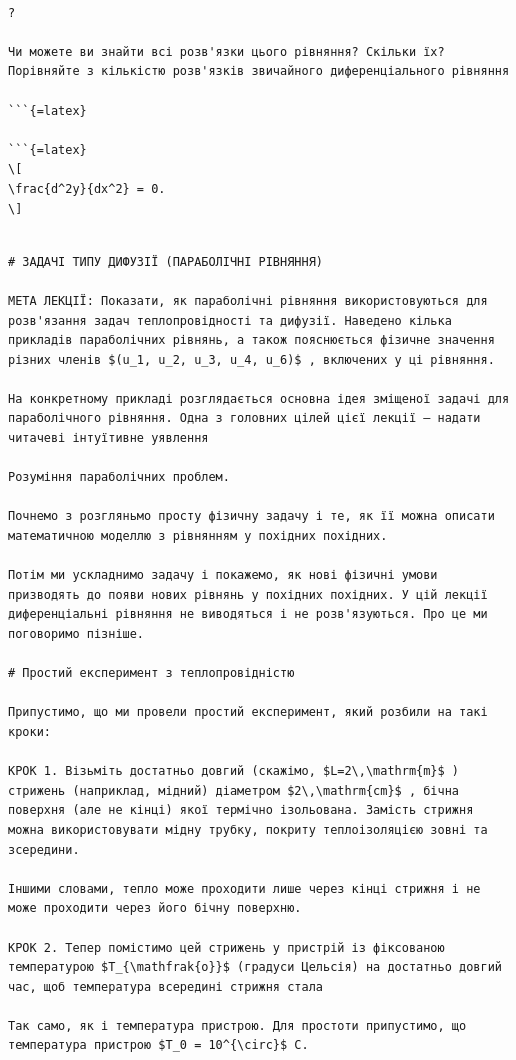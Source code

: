 \documentclass[
  ukrainian,
]{article}
\begin{document}
\begin{verbatim}

?

Чи можете ви знайти всі розв'язки цього рівняння? Скільки їх? Порівняйте з кількістю розв'язків звичайного диференціального рівняння

```{=latex}

```{=latex}
\[
\frac{d^2y}{dx^2} = 0.
\]
\end{verbatim}

\begin{verbatim}

# ЗАДАЧІ ТИПУ ДИФУЗІЇ (ПАРАБОЛІЧНІ РІВНЯННЯ)

МЕТА ЛЕКЦІЇ: Показати, як параболічні рівняння використовуються для розв'язання задач теплопровідності та дифузії. Наведено кілька прикладів параболічних рівнянь, а також пояснюється фізичне значення різних членів $(u_1, u_2, u_3, u_4, u_6)$ , включених у ці рівняння.

На конкретному прикладі розглядається основна ідея зміщеної задачі для параболічного рівняння. Одна з головних цілей цієї лекції — надати читачеві інтуїтивне уявлення

Розуміння параболічних проблем.

Почнемо з розгляньмо просту фізичну задачу і те, як її можна описати математичною моделлю з рівнянням у похідних похідних.

Потім ми ускладнимо задачу і покажемо, як нові фізичні умови призводять до появи нових рівнянь у похідних похідних. У цій лекції диференціальні рівняння не виводяться і не розв'язуються. Про це ми поговоримо пізніше.

# Простий експеримент з теплопровідністю

Припустимо, що ми провели простий експеримент, який розбили на такі кроки:

КРОК 1. Візьміть достатньо довгий (скажімо, $L=2\,\mathrm{m}$ ) стрижень (наприклад, мідний) діаметром $2\,\mathrm{cm}$ , бічна поверхня (але не кінці) якої термічно ізольована. Замість стрижня можна використовувати мідну трубку, покриту теплоізоляцією зовні та зсередини.

Іншими словами, тепло може проходити лише через кінці стрижня і не може проходити через його бічну поверхню.

КРОК 2. Тепер помістимо цей стрижень у пристрій із фіксованою температурою $T_{\mathfrak{o}}$ (градуси Цельсія) на достатньо довгий час, щоб температура всередині стрижня стала

Так само, як і температура пристрою. Для простоти припустимо, що температура пристрою $T_0 = 10^{\circ}$ C.


\end{verbatim}
\end{document}
